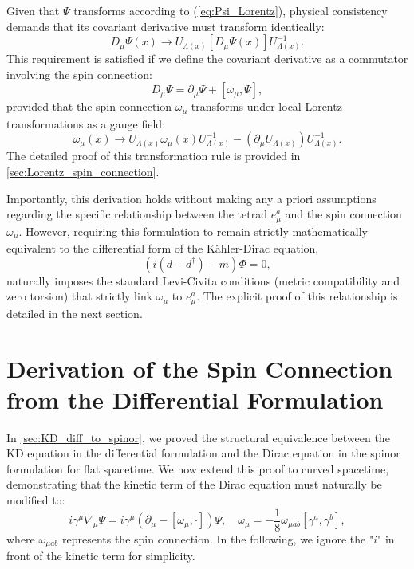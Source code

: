 Given that $\Psi$ transforms according to (\cref{eq:Psi_Lorentz}), physical consistency demands that its covariant derivative must transform identically:
\begin{equation}
  D_{\mu}\Psi(x)\to U_{\Lambda(x)}[D_{\mu}\Psi(x)]U_{\Lambda(x)}^{-1}.
\end{equation}
This requirement is satisfied if we define the covariant derivative as a commutator involving the spin connection:
\begin{equation}
  D_{\mu}\Psi=\partial_{\mu}\Psi+[\omega_{\mu},\Psi],
\end{equation}
provided that the spin connection $\omega_{\mu}$ transforms under local Lorentz transformations as a gauge field:
\begin{equation}
  \omega_{\mu}(x)\to U_{\Lambda(x)}\omega_{\mu}(x) U_{\Lambda(x)}^{-1}-(\partial_{\mu}U_{\Lambda(x)})U_{\Lambda(x)}^{-1}.
\end{equation}
The detailed proof of this transformation rule is provided in \cref{sec:Lorentz_spin_connection}.

Importantly, this derivation holds without making any a priori assumptions regarding the specific relationship between the tetrad $e^{a}_{\mu}$ and the spin connection $\omega_{\mu}$. However, requiring this formulation to remain strictly mathematically equivalent to the differential form of the Kähler-Dirac equation,
\begin{equation}
  (i(d-d^{\dagger})-m)\Phi=0,
\end{equation}
naturally imposes the standard Levi-Civita conditions (metric compatibility and zero torsion) that strictly link $\omega_{\mu}$ to $e^{a}_{\mu}$. The explicit proof of this relationship is detailed in the next section.


\section{Derivation of the Spin Connection from the Differential Formulation}\label{sec:spin_connection_deriv_from_diff}

In \cref{sec:KD_diff_to_spinor}, we proved the structural equivalence between the KD equation in the differential formulation and the Dirac equation in the spinor formulation for flat spacetime. We now extend this proof to curved spacetime, demonstrating that the kinetic term of the Dirac equation must naturally be modified to: 
\begin{equation}
    i\gamma^\mu\nabla_\mu\Psi=i\gamma^\mu(\partial_\mu-[\omega_\mu,\cdot])\Psi,\quad \omega_\mu=-\frac{1}{8}\omega_{\mu ab}[\gamma^a,\gamma^b],
\end{equation}
where $\omega_{\mu ab}$ represents the spin connection. In the following, we ignore the "$i$" in front of the kinetic term for simplicity.

